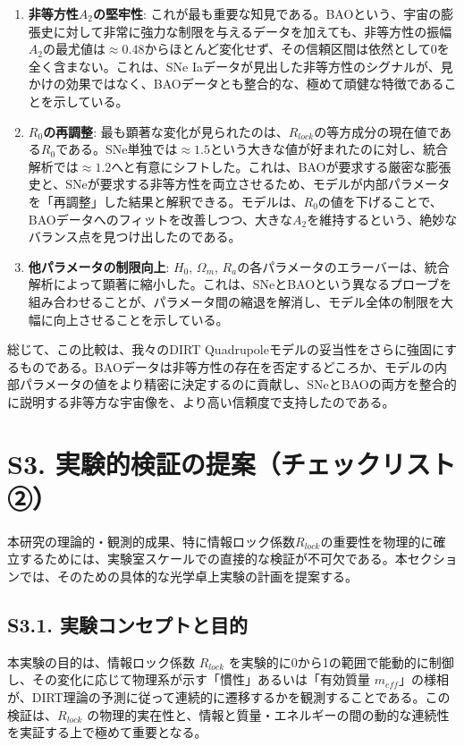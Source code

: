 \documentclass[a4paper,12pt]{article}
\begin{document}
\begin{enumerate}
    \item \textbf{非等方性$A_2$の堅牢性}: これが最も重要な知見である。BAOという、宇宙の膨張史に対して非常に強力な制限を与えるデータを加えても、非等方性の振幅$A_2$の最尤値は$\approx 0.48$からほとんど変化せず、その信頼区間は依然として0を全く含まない。これは、SNe Iaデータが見出した非等方性のシグナルが、見かけの効果ではなく、BAOデータとも整合的な、極めて頑健な特徴であることを示している。
    \item \textbf{$R_0$の再調整}: 最も顕著な変化が見られたのは、$R_{lock}$の等方成分の現在値である$R_0$である。SNe単独では$\approx 1.5$という大きな値が好まれたのに対し、統合解析では$\approx 1.2$へと有意にシフトした。これは、BAOが要求する厳密な膨張史と、SNeが要求する非等方性を両立させるため、モデルが内部パラメータを「再調整」した結果と解釈できる。モデルは、$R_0$の値を下げることで、BAOデータへのフィットを改善しつつ、大きな$A_2$を維持するという、絶妙なバランス点を見つけ出したのである。
    \item \textbf{他パラメータの制限向上}: $H_0$, $\Omega_m$, $R_a$の各パラメータのエラーバーは、統合解析によって顕著に縮小した。これは、SNeとBAOという異なるプローブを組み合わせることが、パラメータ間の縮退を解消し、モデル全体の制限を大幅に向上させることを示している。
\end{enumerate}

総じて、この比較は、我々のDIRT Quadrupoleモデルの妥当性をさらに強固にするものである。BAOデータは非等方性の存在を否定するどころか、モデルの内部パラメータの値をより精密に決定するのに貢献し、SNeとBAOの両方を整合的に説明する非等方な宇宙像を、より高い信頼度で支持したのである。


\section*{S3. 実験的検証の提案（チェックリスト②）}
\label{sec:supp_experimental_proposal}

本研究の理論的・観測的成果、特に情報ロック係数$R_{lock}$の重要性を物理的に確立するためには、実験室スケールでの直接的な検証が不可欠である。本セクションでは、そのための具体的な光学卓上実験の計画を提案する。

\subsection*{S3.1. 実験コンセプトと目的}
\label{subsec:supp_exp_concept}

本実験の目的は、情報ロック係数 $R_{lock}$ を実験的に0から1の範囲で能動的に制御し、その変化に応じて物理系が示す「慣性」あるいは「有効質量 $m_{eff}$」の様相が、DIRT理論の予測に従って連続的に遷移するかを観測することである。この検証は、$R_{lock}$ の物理的実在性と、情報と質量・エネルギーの間の動的な連続性を実証する上で極めて重要となる。
\end{document}
